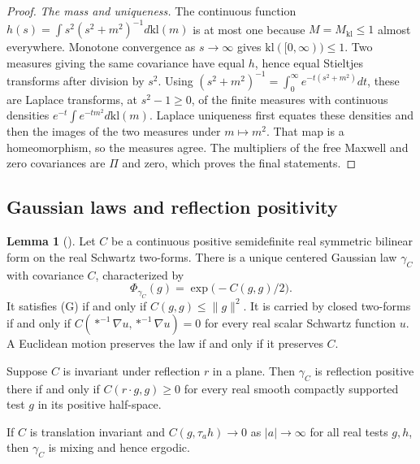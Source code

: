 \documentclass[11pt,letterpaper,reqno]{amsart}
\theoremstyle{definition}
\newtheorem{qcmlemma}[qcmproposition]{Lemma}
\newenvironment{lemma}[1][]{\pushQED{\qed}\renewcommand{\qedsymbol}{$\blacksquare$}\begin{qcmlemma}[#1]}{\popQED\end{qcmlemma}}
\begin{document}
\begin{proof}
\emph{The mass and uniqueness.}
The continuous function
$h(s)=\int s^2(s^2+m^2)^{-1}d\mathrm{kl}(m)$ is at most one because
$M=M_{\mathrm{kl}}\le1$ almost everywhere. Monotone convergence as
$s\to\infty$ gives $\mathrm{kl}([0,\infty))\le1$.
Two measures giving the same covariance have equal $h$, hence equal
Stieltjes transforms after division by $s^2$.
Using
$(s^2+m^2)^{-1}=\int_0^\infty e^{-t(s^2+m^2)}dt$, these are Laplace
transforms, at $s^2-1\ge0$, of the finite measures with continuous
densities $e^{-t}\int e^{-tm^2}d\mathrm{kl}(m)$.
Laplace uniqueness \cite[Section~XIII.1, Theorem~1a]{Feller1971}
first equates these densities and then the images of the two measures
under $m\mapsto m^2$. That map is a homeomorphism, so the measures agree.
The multipliers of the free Maxwell and zero covariances are $\Pi$ and
zero, which proves the final statements.
\end{proof}

\subsection{Gaussian laws and reflection positivity}
\label{qcm:gaussian-laws}

\begin{lemma}\label{qcm:gaussian-covariance}
Let $C$ be a continuous positive semidefinite real symmetric bilinear
form on the real Schwartz two-forms. There is a unique centered
Gaussian law $\gamma_C$ with covariance $C$, characterized by
\[
 \Phi_{\gamma_C}(g)=\exp\bigl(-C(g,g)/2\bigr).
\]
It satisfies (G) if and only if $C(g,g)\le\|g\|^2$.
It is carried by closed two-forms if and only if
$C(*^{-1}\nabla u,*^{-1}\nabla u)=0$ for every real scalar Schwartz
function $u$. A Euclidean motion preserves the law if and only if
it preserves $C$.

Suppose $C$ is invariant under reflection $r$ in a plane. Then
$\gamma_C$ is reflection positive there if and only if
$C(r\cdot g,g)\ge0$ for every real smooth compactly supported test
$g$ in its positive half-space.

If $C$ is translation invariant and
$C(g,\tau_a h)\to0$ as $|a|\to\infty$ for all real tests $g,h$,
then $\gamma_C$ is mixing and hence ergodic.
\end{lemma}
\end{document}
